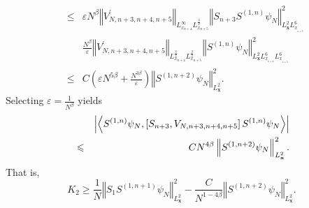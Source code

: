 \documentclass[12pt,letterpaper,leqno]{amsart}
\theoremstyle{plain}
\numberwithin{equation}{section}
\numberwithin{theorem}{section}
\numberwithin{proposition}{section}
\numberwithin{lemma}{section}
\numberwithin{corollary}{section}
\begin{document}
\begin{eqnarray*}
&\leqslant &\varepsilon N^{\beta }\left\Vert V_{N,n+3,n+4,n+5}^{\prime
}\right\Vert _{L_{x_{n+4}}^{\infty }L_{x_{n+5}}^{\frac{3}{2}}}\left\Vert
S_{n+3}S^{(1,n)}\psi _{N}\right\Vert _{L_{\mathbf{x}%
}^{2}L_{x_{_{n+5}}}^{6}}^{2} \\
&&\frac{N^{\beta }}{\varepsilon }\left\Vert V_{N,n+3,n+4,n+5}^{\prime
}\right\Vert _{L_{x_{n+4}}^{\frac{3}{2}}L_{x_{n+5}}^{\frac{3}{2}}}\left\Vert
S^{(1,n)}\psi _{N}\right\Vert _{L_{\mathbf{x}%
}^{2}L_{x_{_{n+4}}}^{6}L_{x_{_{n+5}}}^{6}}^{2} \\
&\leqslant &C\left( \varepsilon N^{5\beta }+\frac{N^{3\beta }}{\varepsilon }%
\right) \left\Vert S^{(1,n+2)}\psi _{N}\right\Vert _{L_{\mathbf{x}}^{2}}^{2}.
\end{eqnarray*}%
Selecting $\varepsilon =\frac{1}{N^{\beta }}$ yields%
\begin{eqnarray*}
&&\left\vert \left\langle S^{(1,n)}\psi _{N},\left[ S_{n+3},V_{N,n+3,n+4,n+5}%
\right] S^{(1,n)}\psi _{N}\right\rangle \right\vert \\
&\leqslant &CN^{4\beta }\left\Vert S^{(1,n+2)}\psi _{N}\right\Vert _{L_{%
\mathbf{x}}^{2}}^{2}.
\end{eqnarray*}%
That is,%
\begin{equation}
K_{2}\geqslant \frac{1}{N}\left\Vert S_{1}S^{(1,n+1)}\psi _{N}\right\Vert
_{L_{\mathbf{x}}^{2}}^{2}-\frac{C}{N^{1-4\beta }}\left\Vert S^{(1,n+2)}\psi
_{N}\right\Vert _{L_{\mathbf{x}}^{2}}^{2}.  \label{energy estimate:K2}
\end{equation}
\end{document}
